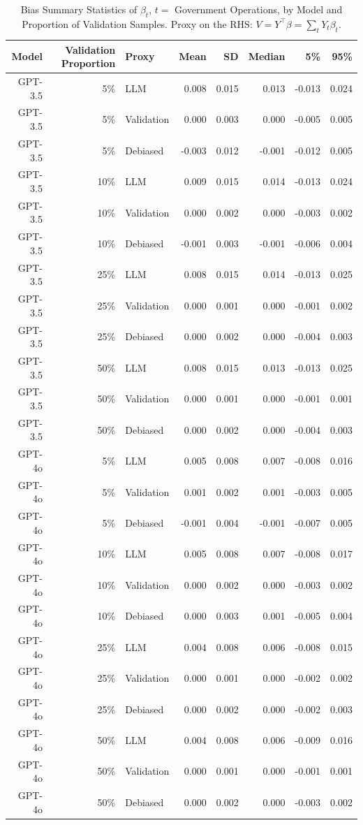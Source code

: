 \begin{table}

\caption{Bias Summary Statistics of $\beta_{t}$, $t=$ Government Operations, by Model and Proportion of Validation Samples. Proxy on the RHS: $V = Y^\top \beta = \sum_{t} Y_t \beta_t$.}
\centering
\begin{tabular}[t]{rrlrrrrr}
\toprule
Model & Validation Proportion & Proxy & Mean & SD & Median & 5\% & 95\%\\
\midrule
GPT-3.5 & 5\% & LLM & 0.008 & 0.015 & 0.013 & -0.013 & 0.024\\
GPT-3.5 & 5\% & Validation & 0.000 & 0.003 & 0.000 & -0.005 & 0.005\\
GPT-3.5 & 5\% & Debiased & -0.003 & 0.012 & -0.001 & -0.012 & 0.005\\
GPT-3.5 & 10\% & LLM & 0.009 & 0.015 & 0.014 & -0.013 & 0.024\\
GPT-3.5 & 10\% & Validation & 0.000 & 0.002 & 0.000 & -0.003 & 0.002\\
GPT-3.5 & 10\% & Debiased & -0.001 & 0.003 & -0.001 & -0.006 & 0.004\\
GPT-3.5 & 25\% & LLM & 0.008 & 0.015 & 0.014 & -0.013 & 0.025\\
GPT-3.5 & 25\% & Validation & 0.000 & 0.001 & 0.000 & -0.001 & 0.002\\
GPT-3.5 & 25\% & Debiased & 0.000 & 0.002 & 0.000 & -0.004 & 0.003\\
GPT-3.5 & 50\% & LLM & 0.008 & 0.015 & 0.013 & -0.013 & 0.025\\
GPT-3.5 & 50\% & Validation & 0.000 & 0.001 & 0.000 & -0.001 & 0.001\\
GPT-3.5 & 50\% & Debiased & 0.000 & 0.002 & 0.000 & -0.004 & 0.003\\
GPT-4o & 5\% & LLM & 0.005 & 0.008 & 0.007 & -0.008 & 0.016\\
GPT-4o & 5\% & Validation & 0.001 & 0.002 & 0.001 & -0.003 & 0.005\\
GPT-4o & 5\% & Debiased & -0.001 & 0.004 & -0.001 & -0.007 & 0.005\\
GPT-4o & 10\% & LLM & 0.005 & 0.008 & 0.007 & -0.008 & 0.017\\
GPT-4o & 10\% & Validation & 0.000 & 0.002 & 0.000 & -0.003 & 0.002\\
GPT-4o & 10\% & Debiased & 0.000 & 0.003 & 0.001 & -0.005 & 0.004\\
GPT-4o & 25\% & LLM & 0.004 & 0.008 & 0.006 & -0.008 & 0.015\\
GPT-4o & 25\% & Validation & 0.000 & 0.001 & 0.000 & -0.002 & 0.002\\
GPT-4o & 25\% & Debiased & 0.000 & 0.002 & 0.000 & -0.002 & 0.003\\
GPT-4o & 50\% & LLM & 0.004 & 0.008 & 0.006 & -0.009 & 0.016\\
GPT-4o & 50\% & Validation & 0.000 & 0.001 & 0.000 & -0.001 & 0.001\\
GPT-4o & 50\% & Debiased & 0.000 & 0.002 & 0.000 & -0.003 & 0.002\\
\bottomrule
\end{tabular}
\end{table}
